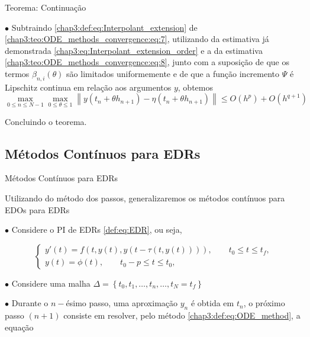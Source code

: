 \documentclass{beamer}
\theoremstyle{plain}
\theoremstyle{definition}
\begin{document}

\begin{frame}{Teorema: Continuação}

    \phantom{aa} $\bullet$  Subtraindo \eqref{chap3:def:eq:Interpolant_extension} de \eqref{chap3:teo:ODE_methods_convergence:eq:7}, utilizando da estimativa já demonstrada \eqref{chap3:eq:Interpolant_extension_order} e a da estimativa \eqref{chap3:teo:ODE_methods_convergence:eq:8}, junto com a suposição de que os termos \(\beta_{n, i}(\theta)\) são limitados uniformemente e de que a função incremento \(\Psi\) é Lipschitz continua em relação aos argumentos \(y\), obtemos
    \[
      \max _{0 \leq n \leq N-1} \max _{0 \leq \theta \leq 1}\left\|y\left(t_{n}+\theta h_{n+1}\right)-\eta\left(t_{n}+\theta h_{n+1}\right)\right\| \leq O\left(h^{p}\right)+O\left(h^{q+1}\right)
    \]

    \noindent 
     Concluindo o teorema.
\end{frame}



\subsection{Métodos Contínuos para EDRs}


\begin{frame}{Métodos Contínuos para EDRs}

    Utilizando do método dos passos, generalizaremos os métodos contínuos para EDOs para EDRs

    \phantom{aa} $\bullet$ Considere o PI de EDRs \eqref{def:eq:EDR}, ou seja,

    \begin{equation}
        \begin{cases}
            y'(t) = f(t, y(t), y(t - \tau(t, y(t)))), \qquad t_0 \leq t \leq t_f , \\
            y(t) = \phi(t), \qquad t_0 - p \leq t \leq t_0,
        \end{cases}
        \label{chap3:def:EDR}
    \end{equation}


    \phantom{aa} $\bullet$ Considere uma malha \(\Delta=\left\{t_{0}, t_{1}, \ldots, t_{n}, \ldots\right., \left.t_{N}=t_{f}\right\}\) 


    \phantom{aa} $\bullet$ Durante o $n-$ésimo passo, uma aproximação \( y_{n} \) é obtida em \( t_{n} \), o próximo passo \((n+1)\) consiste em resolver, pelo método \ref{chap3:def:eq:ODE_method}, a equação



\end{frame}
\end{document}
